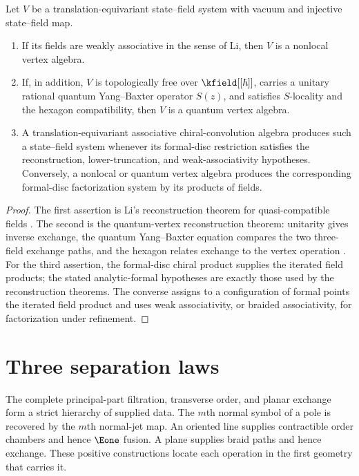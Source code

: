 \begin{theorem}
Let $V$ be a translation-equivariant state--field system with vacuum and injective state--field map.
\begin{enumerate}
\item If its fields are weakly associative in the sense of Li, then $V$ is a nonlocal vertex algebra.
\item If, in addition, $V$ is topologically free over $\kfield[[\hbar]]$, carries a unitary rational quantum Yang--Baxter operator $S(z)$, and satisfies $S$-locality and the hexagon compatibility, then $V$ is a quantum vertex algebra.
\item A translation-equivariant associative chiral-convolution algebra produces such a state--field system whenever its formal-disc restriction satisfies the reconstruction, lower-truncation, and weak-associativity hypotheses.  Conversely, a nonlocal or quantum vertex algebra produces the corresponding formal-disc factorization system by its products of fields.
\end{enumerate}
\end{theorem}
\begin{proof}
The first assertion is Li's reconstruction theorem for quasi-compatible fields \cite{LiNonlocal}.  The second is the quantum-vertex reconstruction theorem: unitarity gives inverse exchange, the quantum Yang--Baxter equation compares the two three-field exchange paths, and the hexagon relates exchange to the vertex operation \cite{LiQVA,DSGKQVA}.  For the third assertion, the formal-disc chiral product supplies the iterated field products; the stated analytic-formal hypotheses are exactly those used by the reconstruction theorems.  The converse assigns to a configuration of formal points the iterated field product and uses weak associativity, or braided associativity, for factorization under refinement.
\end{proof}

\section{Three separation laws}
The complete principal-part filtration, transverse order, and planar exchange form a strict hierarchy of supplied data.  The $m$th normal symbol of a pole is recovered by the $m$th normal-jet map.  An oriented line supplies contractible order chambers and hence $\Eone$ fusion.  A plane supplies braid paths and hence exchange.  These positive constructions locate each operation in the first geometry that carries it.

